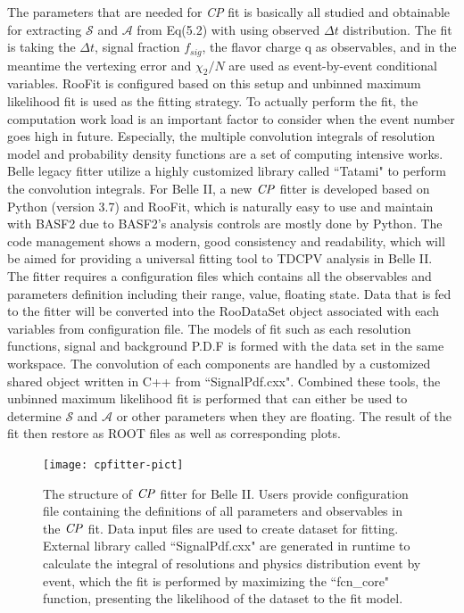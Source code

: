The parameters that are needed for \textit{CP} fit is basically all studied and obtainable for extracting $\mathcal{S}$ and $\mathcal{A}$ from Eq(5.2) with using observed $\Delta t$ distribution. The fit is taking the $\Delta t$, signal fraction $f_{sig}$, the flavor charge q as observables, and in the meantime the vertexing error and $\chi_2/N$ are used as event-by-event conditional variables. RooFit is configured based on this setup and unbinned maximum likelihood fit is used as the fitting strategy.
To actually perform the fit, the computation work load is an important factor to consider when the event number goes high in future.
Especially, the multiple convolution integrals of resolution model and probability density functions are a set of computing intensive works. Belle legacy fitter utilize a highly customized library called ``Tatami" to perform the convolution integrals. For Belle II, a new $\it{CP}$ fitter is developed based on Python (version 3.7) and RooFit, which is naturally easy to use and maintain with BASF2 due to BASF2's analysis controls are mostly done by Python. The code management shows a modern, good consistency and readability, which will be aimed for providing a universal fitting tool to TDCPV analysis in Belle II. The fitter requires a configuration files which contains all the observables and parameters definition including their range, value, floating state. Data that is fed to the fitter will be converted into the RooDataSet object associated with each variables from configuration file. The models of fit such as each resolution functions, signal and background P.D.F is formed with the data set in the same workspace. The convolution of each components are handled by a customized shared object written in C++ from ``SignalPdf.cxx". Combined these tools, the unbinned maximum likelihood fit is performed that can either be used to determine  $\mathcal{S}$ and $\mathcal{A}$ or other parameters when they are floating. The result of the fit then restore as ROOT files as well as corresponding plots.

\begin{figure}[H]
	\centering
	\texttt{[image: cpfitter-pict]}
	\caption{The structure of $\it{CP}$ fitter for Belle II. Users provide configuration file containing the definitions of all parameters and observables in the $\it{CP}$ fit. Data input files are used to create dataset for fitting. External library called ``SignalPdf.cxx" are generated in runtime to calculate the integral of resolutions and physics distribution event by event, which the fit is performed by maximizing the ``fcn\_core" function, presenting the likelihood of the dataset to the fit model. }
\end{figure}



